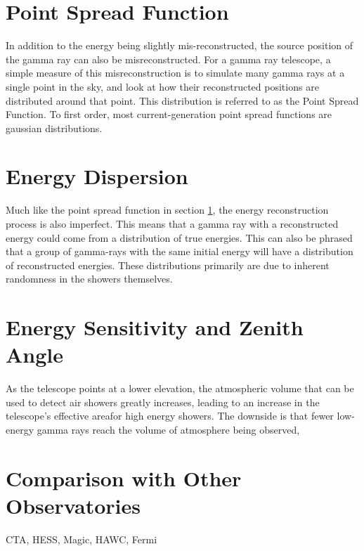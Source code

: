 \section{Point Spread Function}\label{sec:psf}
In addition to the energy being slightly mis-reconstructed, the source position of the gamma ray can also be misreconstructed.
For a gamma ray telescope, a simple measure of this misreconstruction is to simulate many gamma rays at a single point in the sky, and look at how their reconstructed positions are distributed around that point.
This distribution is referred to as the Point Spread Function.
To first order, most current-generation point spread functions are gaussian distributions.

\section{Energy Dispersion}
Much like the point spread function in section \ref{sec:psf}, the energy reconstruction process is also imperfect.
This means that a gamma ray with a reconstructed energy could come from a distribution of true energies.
This can also be phrased that a group of gamma-rays with the same initial energy will have a distribution of reconstructed energies.
These distributions primarily are due to inherent randomness in the showers themselves.

\section{Energy Sensitivity and Zenith Angle}

As the telescope points at a lower elevation, the atmospheric volume that can be used to detect air showers greatly increases, leading to an increase in the telescope's effective areafor high energy showers.
The downside is that fewer low-energy gamma rays reach the volume of atmosphere being observed, 

\section{Comparison with Other Observatories}


CTA, HESS, Magic, HAWC, Fermi

